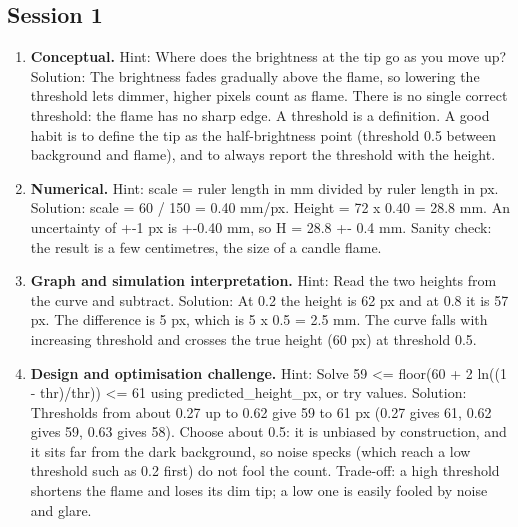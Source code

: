 \documentclass[11pt,a4paper]{article}
\begin{document}
\subsection*{Session 1}
\begin{enumerate}[nosep]
\item \textbf{Conceptual.} Hint: Where does the brightness at the tip go as you move up? Solution: The brightness fades gradually above the flame, so lowering the threshold lets dimmer, higher pixels count as flame. There is no single correct threshold: the flame has no sharp edge. A threshold is a definition. A good habit is to define the tip as the half-brightness point (threshold 0.5 between background and flame), and to always report the threshold with the height.
\item \textbf{Numerical.} Hint: scale = ruler length in mm divided by ruler length in px. Solution: scale = 60 / 150 = 0.40 mm/px. Height = 72 x 0.40 = 28.8 mm. An uncertainty of +-1 px is +-0.40 mm, so H = 28.8 +- 0.4 mm. Sanity check: the result is a few centimetres, the size of a candle flame.
\item \textbf{Graph and simulation interpretation.} Hint: Read the two heights from the curve and subtract. Solution: At 0.2 the height is 62 px and at 0.8 it is 57 px. The difference is 5 px, which is 5 x 0.5 = 2.5 mm. The curve falls with increasing threshold and crosses the true height (60 px) at threshold 0.5.
\item \textbf{Design and optimisation challenge.} Hint: Solve 59 \textless{}= floor(60 + 2 ln((1 - thr)/thr)) \textless{}= 61 using predicted\_height\_px, or try values. Solution: Thresholds from about 0.27 up to 0.62 give 59 to 61 px (0.27 gives 61, 0.62 gives 59, 0.63 gives 58). Choose about 0.5: it is unbiased by construction, and it sits far from the dark background, so noise specks (which reach a low threshold such as 0.2 first) do not fool the count. Trade-off: a high threshold shortens the flame and loses its dim tip; a low one is easily fooled by noise and glare.
\end{enumerate}
\end{document}
